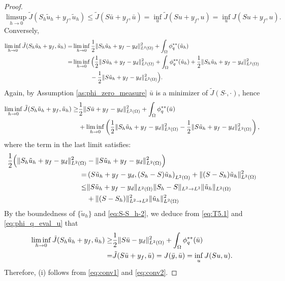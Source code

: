 \begin{proof}
\begin{equation}
	\limsup_{h \to 0} \tilde J(S_h \tilde u_h+y_f, \tilde u_h) \leq     \tilde J (S\bar u+y_f, \bar u) = \inf_u \tilde J(Su+y_f,u) = \inf_u J(Su+y_f,u).  \label{eq:conv1}
\end{equation}
Conversely,  
\begin{align}
	\liminf_{h \to 0} \tilde J(S_h \tilde u_h+y_f, \tilde u_h) = & \liminf_{h\to 0}  \frac12 \lVert S_h \tilde u_h+y_f -y_d \rVert^2_{L^2(\Omega)} + \int_\Omega \phi_q^{**} (\tilde u_h)  \nonumber \\
	=&\liminf_{h\to 0} \Big( \frac12 \lVert S \tilde u_h+y_f -y_d \rVert^2_{L^2(\Omega)} + \int_\Omega \phi_q^{**}  (\tilde u_h)  + \frac12 \lVert S_h \tilde u_h +y_f -y_d \rVert^2_{L^2(\Omega)}   \\
    &\quad\qquad-\frac12 \lVert S\tilde u_h+y_f -y_d \rVert^2_{L^2(\Omega)} \Big). \nonumber
\end{align}
Again, by Assumption \ref{as:phi_zero_measure}  $\bar u$ is a minimizer of  $ \tilde J (S \cdot,\cdot)$, hence
\begin{align}
\liminf_{h \to 0} \tilde J(S_h \tilde u_h+y_f, \tilde u_h)	\geq & \frac12 \lVert S \bar u+y_f -y_d \rVert^2_{L^2(\Omega)} + \int_\Omega \phi_q^{**}  (\bar u) \nonumber \\
&+  \liminf_{h\to 0} \left( \frac12 \lVert   S_h\tilde u_h+y_f -y_d \rVert^2_{L^2(\Omega)}  - \frac12 \lVert S \tilde u_h+y_f -y_d \rVert^2_{L^2(\Omega)} \right), \label{eq:T5.1}
	\end{align}            
where the term in the last limit satisfies:  
\begin{equation*}
\begin{split}
 \frac12\Big( \lVert   S_h\tilde u_h+y_f -y_d \rVert^2_{L^2(\Omega)} &- \lVert S \tilde u_h +y_f-y_d \rVert^2_{L^2(\Omega)}\Big)\\ =&\left(S \tilde u_h+y_f-y_d,(S_h-S)\tilde u_h\right)_{L^2(\Omega)}+\lVert (S-S_h)\tilde u_h \rVert_{L^2(\Omega)}^2\\
  \leq & \|S \tilde u_h+y_f-y_d\|_{L^2(\Omega)} \|S_h-S\|_{L^2\to L^2} \|\tilde u_h\|_{L^2(\Omega)} \\
  &+\lVert (S-S_h) \rVert^2_{L^2 \to L^2} \|\tilde u_h\|_{L^2(\Omega)}^2 
 \end{split}
\end{equation*}
By the boundedness of $\{\tilde u_h\}$ and \eqref{eq:S-S_h-2}, we deduce from \eqref{eq:T5.1} and \eqref{eq:phi_q_eval_u} that
\begin{align}
	\liminf_{h \to 0} \tilde J(S_h \tilde u_h+y_f, \tilde u_h) \geq & \frac12 \lVert S \bar u -y_d \rVert^2_{L^2(\Omega)} + \int_\Omega \phi_q^{**} (\bar u) \nonumber \\=& \tilde J(S\bar u+y_f, \bar u )= J(\bar y,\bar u) = \inf_u J(Su,u). \label{eq:conv2}
	\end{align}
Therefore, (i) follows from \eqref{eq:conv1} and \eqref{eq:conv2}.  


\end{proof}
